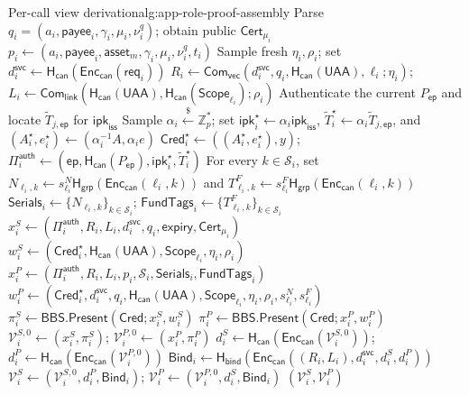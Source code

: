 \documentclass[letterpaper]{article}
\newcommand{\commit}{\mathsf{Com}}
\newcommand{\hash}{\mathsf{H}_{\mathsf{can}}}
\newcommand{\hashBind}{\mathsf{H}_{\mathsf{bind}}}
\newcommand{\hashG}{\mathsf{H}_{\mathsf{grp}}}
\newcommand{\Zp}{\mathbb{Z}_p}
\begin{document}
\begin{MMAppendixAlgorithm}{Per-call view derivation}{alg:app-role-proof-assembly}
\State Parse \(q_i=(a_i,\mathsf{payee}_i,\gamma_i,
  \mu_i,\nu_i^q)\); obtain public \(\mathsf{Cert}_{\mu_i}\)
\State \(p_i\leftarrow(a_i,\mathsf{payee}_i,\mathsf{asset}_m,
  \gamma_i,\mu_i,\nu_i^q,t_i)\)
\State Sample fresh \(\eta_i,\rho_i\); set
  \(d_i^{\mathsf{svc}}\leftarrow\hash(\mathsf{Enc}_{\mathsf{can}}
  (\mathsf{req}_i))\)
\State \(R_i\leftarrow\commit_{\mathsf{vec}}(d_i^{\mathsf{svc}},q_i,
  \hash(\mathsf{UAA}),\ell_i;\eta_i)\); \quad
  \(L_i\leftarrow\commit_{\mathsf{link}}(\hash(\mathsf{UAA}),
  \hash(\mathsf{Scope}_{\ell_i});\rho_i)\)
\State Authenticate the current \(P_{\mathsf{ep}}\) and locate
  \(\widetilde T_{j,\mathsf{ep}}\) for \(\mathsf{ipk}_{\mathsf{iss}}\)
\State Sample \(\alpha_i\stackrel{\$}{\leftarrow}\Zp^\ast\); set
  \(\mathsf{ipk}_i^\star\leftarrow\alpha_i\mathsf{ipk}_{\mathsf{iss}}\),
  \(\widetilde T_i^\star\leftarrow\alpha_i\widetilde T_{j,\mathsf{ep}}\), and
  \((A_i^\star,e_i^\star)\leftarrow(\alpha_i^{-1}A,\alpha_i e)\)
\State \(\mathsf{Cred}_i^\star\leftarrow((A_i^\star,e_i^\star),y)\); \quad
  \(\Pi_i^{\mathsf{auth}}\leftarrow(\mathsf{ep},\hash(P_{\mathsf{ep}}),
  \mathsf{ipk}_i^\star,\widetilde T_i^\star)\)
\State For every \(k\in\mathcal S_i\), set
  \(N_{\ell_i,k}\leftarrow s^N_{\ell_i}\hashG(
  \mathsf{Enc}_{\mathsf{can}}(\ell_i,k))\) and
  \(T^F_{\ell_i,k}\leftarrow s^F_{\ell_i}\hashG(
  \mathsf{Enc}_{\mathsf{can}}(\ell_i,k))\)
\State \(\mathsf{Serials}_i\leftarrow\{N_{\ell_i,k}\}_{k\in\mathcal S_i}\); \quad
  \(\mathsf{FundTags}_i\leftarrow\{T^F_{\ell_i,k}\}_{k\in\mathcal S_i}\)
\State \(x_i^S\leftarrow(\Pi_i^{\mathsf{auth}},R_i,L_i,
  d_i^{\mathsf{svc}},q_i,\mathsf{expiry},\mathsf{Cert}_{\mu_i})\)
\State \(w_i^S\leftarrow(\mathsf{Cred}_i^\star,
  \hash(\mathsf{UAA}),\mathsf{Scope}_{\ell_i},\eta_i,\rho_i)\)
\State \(x_i^P\leftarrow(\Pi_i^{\mathsf{auth}},R_i,L_i,p_i,
  \mathcal S_i,\mathsf{Serials}_i,\mathsf{FundTags}_i)\)
\State \(w_i^P\leftarrow(\mathsf{Cred}_i^\star,
  d_i^{\mathsf{svc}},q_i,\hash(\mathsf{UAA}),
  \mathsf{Scope}_{\ell_i},\eta_i,\rho_i,s^N_{\ell_i},s^F_{\ell_i})\)
\State \(\pi_i^S\leftarrow
  \mathsf{BBS.Present}(\mathsf{Cred};x_i^S,w_i^S)\)
\State \(\pi_i^P\leftarrow
  \mathsf{BBS.Present}(\mathsf{Cred};x_i^P,w_i^P)\)
\State \(\mathcal V_i^{S,0}\leftarrow(x_i^S,\pi_i^S)\); \quad
  \(\mathcal V_i^{P,0}\leftarrow(x_i^P,\pi_i^P)\)
\State \(d_i^S\leftarrow\hash(\mathsf{Enc}_{\mathsf{can}}
  (\mathcal V_i^{S,0}))\); \quad
  \(d_i^P\leftarrow\hash(\mathsf{Enc}_{\mathsf{can}}
  (\mathcal V_i^{P,0}))\)
\State \(\mathsf{Bind}_i\leftarrow\hashBind(
  \mathsf{Enc}_{\mathsf{can}}((R_i,L_i),d_i^{\mathsf{svc}},d_i^S,d_i^P))\)
\State \(\mathcal V_i^{S}\leftarrow
  (\mathcal V_i^{S,0},d_i^P,\mathsf{Bind}_i)\); \quad
  \(\mathcal V_i^{P}\leftarrow
  (\mathcal V_i^{P,0},d_i^S,\mathsf{Bind}_i)\)
\State \Return \((\mathcal V_i^{S},
  \mathcal V_i^{P})\)
\end{MMAppendixAlgorithm}
\end{document}
